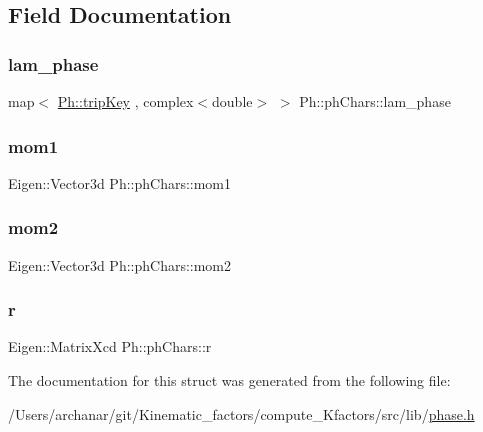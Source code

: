 \subsection{Field Documentation}
\mbox{\label{structPh_1_1phChars_af79d4feac7df252a92fc9faf0500d214}} 
\subsubsection{\texorpdfstring{lam\_phase}{lam\_phase}}
{\footnotesize\ttfamily map$<$ \mbox{\hyperlink{namespacePh_afdd5bf3d7b37625115089ea3048e0cbb}{Ph\+::trip\+Key}} , complex$<$double$>$ $>$ Ph\+::ph\+Chars\+::lam\+\_\+phase}

\mbox{\label{structPh_1_1phChars_a3f4e550bbbc61af48cbe3c39bbea4147}} 
\subsubsection{\texorpdfstring{mom1}{mom1}}
{\footnotesize\ttfamily Eigen\+::\+Vector3d Ph\+::ph\+Chars\+::mom1}

\mbox{\label{structPh_1_1phChars_a1458e97056bb5c7a5f99a2b81e33eddc}} 
\subsubsection{\texorpdfstring{mom2}{mom2}}
{\footnotesize\ttfamily Eigen\+::\+Vector3d Ph\+::ph\+Chars\+::mom2}

\mbox{\label{structPh_1_1phChars_a953b0c01407ecc9b6ba27aa49a9f8587}} 
\subsubsection{\texorpdfstring{r}{r}}
{\footnotesize\ttfamily Eigen\+::\+Matrix\+Xcd Ph\+::ph\+Chars\+::r}



The documentation for this struct was generated from the following file\+:\begin{DoxyCompactItemize}
\item 
/\+Users/archanar/git/\+Kinematic\+\_\+factors/compute\+\_\+\+Kfactors/src/lib/\mbox{\hyperlink{phase_8h}{phase.\+h}}\end{DoxyCompactItemize}
